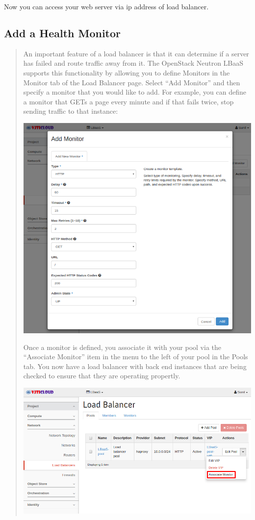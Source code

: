 \documentclass[letterpaper,10pt,english]{sphinxmanual}
\begin{document}
\begin{enumerate}
Now you can access your web server via ip address of load balancer.

\end{enumerate}


\subsection{Add a Health Monitor}
\label{_source/projects/project2:add-a-health-monitor}\begin{quote}

An important feature of a load balancer is that it can determine if a server has failed and route traffic away from it. The OpenStack Neutron LBaaS supports this functionality by allowing you to define Monitors in the Monitor tab of the Load Balancer page. Select “Add Monitor” and then specify a monitor that you would like to add. For example, you can define a monitor that GETs a page every minute and if that fails twice, stop sending traffic to that instance:

\includegraphics{lbaas_health_monitor.png}

Once a monitor is defined, you associate it with your pool via the “Associate Monitor” item in the menu to the left of your pool in the Pools tab. You now have a load balancer with back end instances that are being checked to ensure that they are operating propertly.

\includegraphics{lbaas_pool_monitor.png}


\end{quote}
\end{document}
